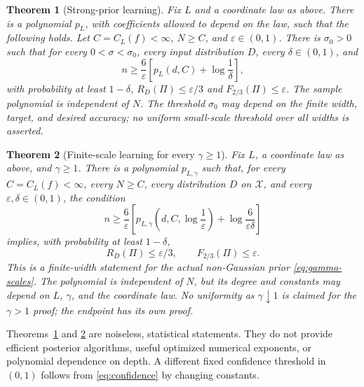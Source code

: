 \documentclass[11pt]{article}
\newtheorem{theorem}{Theorem}[section]\newtheorem{proposition}[theorem]{Proposition}
\theoremstyle{remark}\newtheorem{remark}[theorem]{Remark}
\begin{document}
\begin{theorem}[Strong-prior learning]\label{thm:strong-main}
Fix $L$ and a coordinate law as above. There is a polynomial $p_L$, with
coefficients allowed to depend on the law, such that the following holds.
Let $C=C_L(f)<\infty$, $N\geq C$, and $\varepsilon\in(0,1)$.
There is $\sigma_0>0$ such that for every $0<\sigma<\sigma_0$, every
input distribution $D$, every $\delta\in(0,1)$, and
\[
 n\geq\frac6\varepsilon
       \left[p_L(d,C)+\log\frac1\delta\right],
\]
with probability at least $1-\delta$,
$R_D(\Pi)\leq\varepsilon/3$ and $F_{2/3}(\Pi)\leq\varepsilon$.
The sample polynomial is independent of $N$. The threshold $\sigma_0$
may depend on the finite width, target, and desired accuracy; no uniform
small-scale threshold over all widths is asserted.
\end{theorem}

\begin{theorem}[Finite-scale learning for every $\gamma\geq1$]
\label{thm:finite-main}
Fix $L$, a coordinate law as above, and $\gamma\geq1$. There is a
polynomial $p_{L,\gamma}$ such that, for every $C=C_L(f)<\infty$,
every $N\geq C$, every distribution $D$ on $\mathcal X$, and every
$\varepsilon,\delta\in(0,1)$, the condition
\begin{equation}\label{eq:main-sample}
 n\geq\frac6\varepsilon\left[
 p_{L,\gamma}\!\left(d,C,\log\frac1\varepsilon\right)
 +\log\frac6{\varepsilon\delta}\right]
\end{equation}
implies, with probability at least $1-\delta$,
\[
 R_D(\Pi)\leq\varepsilon/3,\qquad F_{2/3}(\Pi)\leq\varepsilon.
\]
This is a finite-width statement for the actual non-Gaussian prior
\eqref{eq:gamma-scales}. The polynomial is independent of $N$, but its
degree and constants may depend on $L$, $\gamma$, and the coordinate law.
No uniformity as $\gamma\downarrow1$ is claimed for the $\gamma>1$ proof;
the endpoint has its own proof.
\end{theorem}

Theorems~\ref{thm:strong-main} and \ref{thm:finite-main} are noiseless,
statistical statements. They do not provide efficient posterior algorithms,
useful optimized numerical exponents, or polynomial dependence on depth.
A different fixed confidence threshold in $(0,1)$ follows from
\eqref{eq:confidence} by changing constants.
\end{document}
